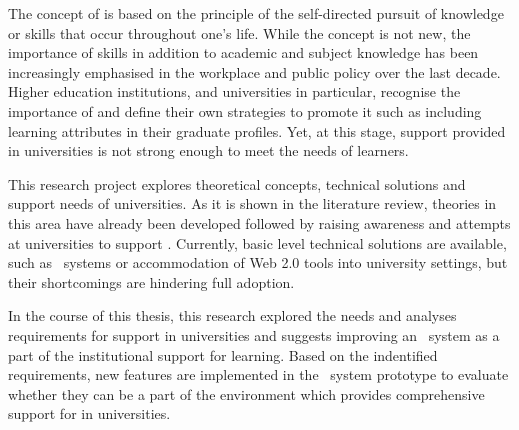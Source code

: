 The concept of \LLLs is based on the principle of the self-directed pursuit of
knowledge or skills that occur throughout one's life. While the concept is not
new, the importance of \LLLs skills in addition to academic and subject
knowledge has been increasingly emphasised in the workplace and public policy
over the last decade. Higher education institutions, and universities in
particular, recognise the importance of \LLLs and define their own strategies to
promote it such as including learning attributes in their graduate profiles.
Yet, at this stage, \LLLs support provided in universities is not strong enough
to meet the needs of learners.

This research project explores theoretical concepts, technical solutions and
\LLLs support needs of universities. As it is shown in the literature review,
theories in this area have already been developed followed by raising awareness
and attempts at universities to support \LLLsn. Currently, basic level technical
solutions are available, such as \ep~systems or accommodation of Web 2.0 tools
into university settings, but their shortcomings are hindering full adoption.

In the course of this thesis, this research explored the needs and analyses
requirements for \LLL support in universities and suggests improving an
\ep~system as a part of the institutional support for learning. Based on the
indentified requirements, new features are implemented in the \ep~system
prototype to evaluate whether they can be a part of the environment which
provides comprehensive support for \LLLs in universities.
